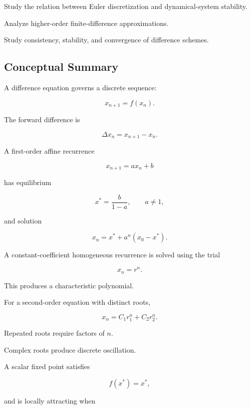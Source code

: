 \begin{exercise}[4]
Study the relation between Euler discretization and dynamical-system
stability.
\end{exercise}

\begin{exercise}[4]
Analyze higher-order finite-difference approximations.
\end{exercise}

\begin{exercise}[4]
Study consistency, stability, and convergence of difference schemes.
\end{exercise}

\subsection{Conceptual Summary}
\label{subsec:difference-equation-summary}

A difference equation governs a discrete sequence:

\[
\boxed{
x_{n+1}
=
f(x_n).
}
\]

The forward difference is

\[
\boxed{
\Delta x_n
=
x_{n+1}-x_n.
}
\]

A first-order affine recurrence

\[
\boxed{
x_{n+1}=ax_n+b
}
\]

has equilibrium

\[
\boxed{
x^*
=
\frac{
b
}{
1-a
},
\qquad
a\neq1,
}
\]

and solution

\[
\boxed{
x_n
=
x^*
+
a^n(x_0-x^*).
}
\]

A constant-coefficient homogeneous recurrence is solved using the trial

\[
\boxed{
x_n=r^n.
}
\]

This produces a characteristic polynomial.

For a second-order equation with distinct roots,

\[
\boxed{
x_n
=
C_1r_1^n
+
C_2r_2^n.
}
\]

Repeated roots require factors of \(n\).

Complex roots produce discrete oscillation.

A scalar fixed point satisfies

\[
\boxed{
f(x^*)=x^*,
}
\]

and is locally attracting when


